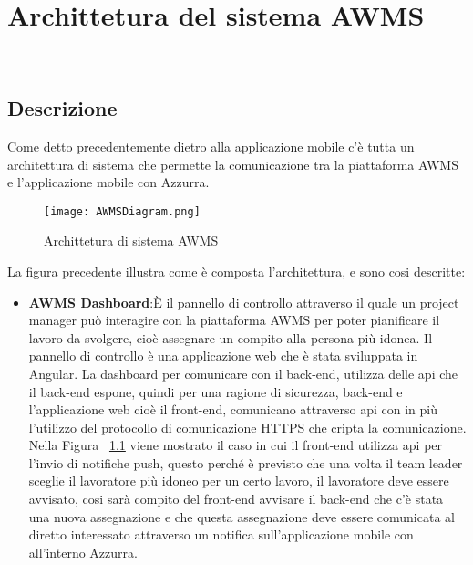 \chapter{Archittetura del sistema AWMS}
\label{cap:archittettura del sistema AWMS}

\\


\section{Descrizione}
Come detto precedentemente dietro alla applicazione mobile c'è tutta un architettura di sistema che permette la comunicazione tra la piattaforma AWMS e l'applicazione mobile con Azzurra.
 
 \begin{figure}[h]
 	\begin{center}
 		\texttt{[image: AWMSDiagram.png]}
 		\caption{Archittetura di sistema AWMS}
 		\label{fig:arch}
 	\end{center}
 \end{figure}

La figura precedente illustra come è composta l'architettura, e sono cosi descritte:
\begin{itemize}
	\item \textbf{AWMS Dashboard}:È il pannello di controllo attraverso il quale un project manager può interagire con la piattaforma AWMS per poter pianificare il lavoro da svolgere, cioè assegnare un compito alla persona più idonea. Il pannello di controllo è una applicazione web che è stata sviluppata in Angular. La dashboard per comunicare con il back-end, utilizza delle \gls{api} che il back-end espone, quindi per una ragione di sicurezza, back-end e l'applicazione web cioè il front-end, comunicano attraverso \gls{api} con in più l'utilizzo del protocollo di comunicazione HTTPS che cripta la comunicazione. Nella Figura ~\ref{fig:arch} viene mostrato il caso in cui il front-end utilizza \gls{api} per l'invio di notifiche push, questo perché è previsto che una volta il team leader sceglie il lavoratore più idoneo per un certo lavoro, il lavoratore deve essere avvisato, cosi sarà compito del front-end avvisare il back-end che c'è stata una nuova assegnazione e che questa assegnazione deve essere comunicata al diretto interessato attraverso un notifica sull'applicazione mobile con all'interno Azzurra.
\end{itemize}